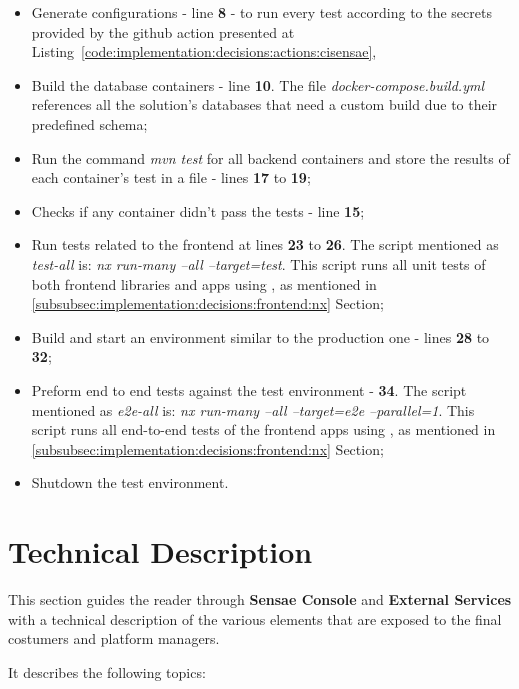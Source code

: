 \begin{itemize}
    \item Generate configurations - line \textbf{8} - to run every test according to the secrets provided by the github action presented at Listing~\ref{code:implementation:decisions:actions:cisensae},
    \item Build the database containers - line \textbf{10}. The file \textit{docker-compose.build.yml} references all the solution's databases that need a custom build due to their predefined schema;
    \item Run the command \textit{mvn test} for all backend containers and store the results of each container's test in a file - lines \textbf{17} to \textbf{19};
    \item Checks if any container didn't pass the tests - line \textbf{15};
    \item Run tests related to the frontend at lines \textbf{23} to \textbf{26}. The script mentioned as \textit{test-all} is: \textit{nx run-many --all --target=test}. This script runs all unit tests of both frontend libraries and apps using , as mentioned in \ref{subsubsec:implementation:decisions:frontend:nx} Section;
    \item Build and start an environment similar to the production one - lines \textbf{28} to \textbf{32};
    \item Preform end to end tests against the test environment - \textbf{34}. The script mentioned as \textit{e2e-all} is: \textit{nx run-many --all --target=e2e --parallel=1}. This script runs all end-to-end tests of the frontend apps using , as mentioned in \ref{subsubsec:implementation:decisions:frontend:nx} Section;
    \item Shutdown the test environment.
\end{itemize}

\section{Technical Description}
\label{sec:implementation:description}

This section guides the reader through \textbf{Sensae Console} and \textbf{External Services} with a technical description of the various elements that are exposed to the final costumers and platform managers.

It describes the following topics:

